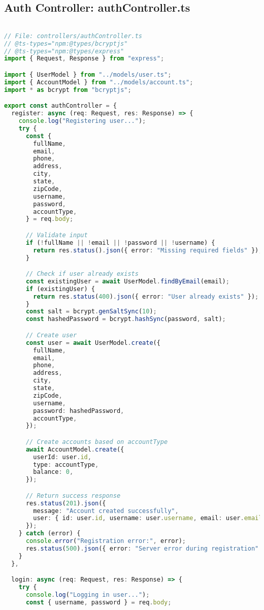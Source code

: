 \subsection{Auth Controller: authController.ts}
\begin{lstlisting}[language=TypeScript]

// File: controllers/authController.ts
// @ts-types="npm:@types/bcryptjs"
// @ts-types="npm:@types/express"
import { Request, Response } from "express";

import { UserModel } from "../models/user.ts";
import { AccountModel } from "../models/account.ts";
import * as bcrypt from "bcryptjs";

export const authController = {
  register: async (req: Request, res: Response) => {
    console.log("Registering user...");
    try {
      const {
        fullName,
        email,
        phone,
        address,
        city,
        state,
        zipCode,
        username,
        password,
        accountType,
      } = req.body;

      // Validate input
      if (!fullName || !email || !password || !username) {
        return res.status().json({ error: "Missing required fields" });
      }

      // Check if user already exists
      const existingUser = await UserModel.findByEmail(email);
      if (existingUser) {
        return res.status(400).json({ error: "User already exists" });
      }
      const salt = bcrypt.genSaltSync(10);
      const hashedPassword = bcrypt.hashSync(password, salt);

      // Create user
      const user = await UserModel.create({
        fullName,
        email,
        phone,
        address,
        city,
        state,
        zipCode,
        username,
        password: hashedPassword,
        accountType,
      });

      // Create accounts based on accountType
      await AccountModel.create({
        userId: user.id,
        type: accountType,
        balance: 0,
      });

      // Return success response
      res.status(201).json({
        message: "Account created successfully",
        user: { id: user.id, username: user.username, email: user.email },
      });
    } catch (error) {
      console.error("Registration error:", error);
      res.status(500).json({ error: "Server error during registration" });
    }
  },

  login: async (req: Request, res: Response) => {
    try {
      console.log("Logging in user...");
      const { username, password } = req.body;


\end{lstlisting}
